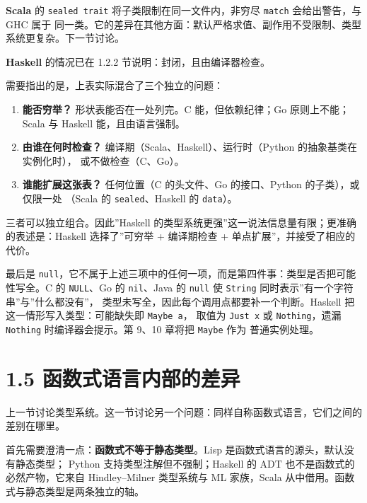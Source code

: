 \textbf{Scala} 的 \passthrough{\lstinline!sealed trait!} 将子类限制在同一文件内，非穷尽 \passthrough{\lstinline!match!} 会给出警告，与 GHC 属于
同一类。它的差异在其他方面：默认严格求值、副作用不受限制、类型系统更复杂。下一节讨论。

\textbf{Haskell} 的情况已在 1.2.2 节说明：封闭，且由编译器检查。

需要指出的是，上表实际混合了三个独立的问题：

\begin{enumerate}
\def\labelenumi{\arabic{enumi}.}
\tightlist
\item
  \textbf{能否穷举？} 形状表能否在一处列完。C 能，但依赖纪律；Go 原则上不能；Scala 与 Haskell
  能，且由语言强制。
\item
  \textbf{由谁在何时检查？} 编译期（Scala、Haskell）、运行时（Python 的抽象基类在实例化时），
  或不做检查（C、Go）。
\item
  \textbf{谁能扩展这张表？} 任何位置（C 的头文件、Go 的接口、Python 的子类），或仅限一处
  （Scala 的 \passthrough{\lstinline!sealed!}、Haskell 的 \passthrough{\lstinline!data!}）。
\end{enumerate}

三者可以独立组合。因此''Haskell 的类型系统更强''这一说法信息量有限；更准确的表述是：Haskell
选择了''可穷举 + 编译期检查 + 单点扩展''，并接受了相应的代价。

最后是 \passthrough{\lstinline!null!}，它不属于上述三项中的任何一项，而是第四件事：类型是否把可能性写全。C 的
\passthrough{\lstinline!NULL!}、Go 的 \passthrough{\lstinline!nil!}、Java 的 \passthrough{\lstinline!null!} 使 \passthrough{\lstinline!String!} 同时表示''有一个字符串''与''什么都没有''，
类型未写全，因此每个调用点都要补一个判断。Haskell 把这一情形写入类型：可能缺失即 \passthrough{\lstinline!Maybe a!}，
取值为 \passthrough{\lstinline!Just x!} 或 \passthrough{\lstinline!Nothing!}，遗漏 \passthrough{\lstinline!Nothing!} 时编译器会提示。第 9、10 章将把 \passthrough{\lstinline!Maybe!} 作为
普通实例处理。

\section{1.5 函数式语言内部的差异}\label{ux51fdux6570ux5f0fux8bedux8a00ux5185ux90e8ux7684ux5deeux5f02}

上一节讨论类型系统。这一节讨论另一个问题：同样自称函数式语言，它们之间的差别在哪里。

首先需要澄清一点：\textbf{函数式不等于静态类型}。Lisp 是函数式语言的源头，默认没有静态类型；
Python 支持类型注解但不强制；Haskell 的 ADT 也不是函数式的必然产物，它来自 Hindley--Milner
类型系统与 ML 家族，Scala 从中借用。函数式与静态类型是两条独立的轴。

